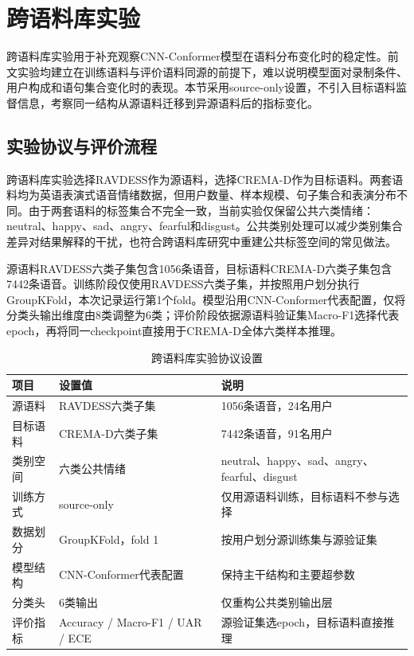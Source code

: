 \section{跨语料库实验}

跨语料库实验用于补充观察CNN-Conformer模型在语料分布变化时的稳定性。前文实验均建立在训练语料与评价语料同源的前提下，难以说明模型面对录制条件、用户构成和语句集合变化时的表现。本节采用source-only设置，不引入目标语料监督信息，考察同一结构从源语料迁移到异源语料后的指标变化\cite{zhang2020transfer,luo2020nonnegative,su2023unsupervised,lu2022domain,ahn2025multitask,gao2024adversarial}。

\subsection{实验协议与评价流程}

跨语料库实验选择RAVDESS作为源语料，选择CREMA-D作为目标语料。两套语料均为英语表演式语音情绪数据，但用户数量、样本规模、句子集合和表演分布不同。由于两套语料的标签集合不完全一致，当前实验仅保留公共六类情绪：neutral、happy、sad、angry、fearful和disgust。公共类别处理可以减少类别集合差异对结果解释的干扰，也符合跨语料库研究中重建公共标签空间的常见做法\cite{zhang2020transfer,luo2020nonnegative,ahn2025multitask,gao2024adversarial}。

源语料RAVDESS六类子集包含1056条语音，目标语料CREMA-D六类子集包含7442条语音。训练阶段仅使用RAVDESS六类子集，并按照用户划分执行GroupKFold，本次记录运行第1个fold。模型沿用CNN-Conformer代表配置，仅将分类头输出维度由8类调整为6类；评价阶段依据源语料验证集Macro-F1选择代表epoch，再将同一checkpoint直接用于CREMA-D全体六类样本推理。

\begin{table}[!htbp]
    \centering
    \caption{跨语料库实验协议设置}
    \label{tab:chapter4_cross_corpus_setting}
    \footnotesize
    \setlength{\tabcolsep}{3pt}
    \renewcommand{\arraystretch}{0.9}
    \begin{tabularx}{\textwidth}{p{}XX}
        \toprule
        项目 & 设置值 & 说明 \\
        \midrule
        源语料 & RAVDESS六类子集 & 1056条语音，24名用户 \\
        目标语料 & CREMA-D六类子集 & 7442条语音，91名用户 \\
        类别空间 & 六类公共情绪 & neutral、happy、sad、angry、fearful、disgust \\
        训练方式 & source-only & 仅用源语料训练，目标语料不参与选择 \\
        数据划分 & GroupKFold，fold 1 & 按用户划分源训练集与源验证集 \\
        模型结构 & CNN-Conformer代表配置 & 保持主干结构和主要超参数 \\
        分类头 & 6类输出 & 仅重构公共类别输出层 \\
        评价指标 & Accuracy / Macro-F1 / UAR / ECE & 源验证集选epoch，目标语料直接推理 \\
        \bottomrule
    \end{tabularx}
\end{table}

